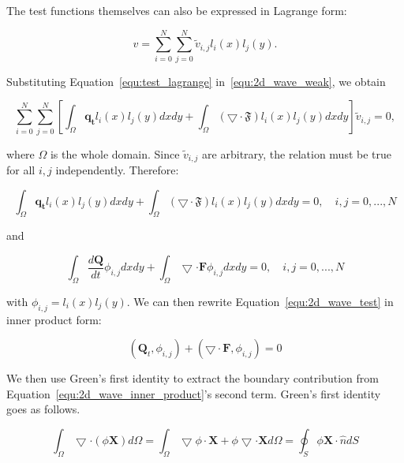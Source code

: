 The test functions themselves can also be expressed in Lagrange form:

\begin{equation} \label{equ:test_lagrange}
	v = \sum^{N}_{i = 0}\sum_{j = 0}^{N}\widetilde{v}_{i, j}l_i(x)l_j(y).
\end{equation}

Substituting Equation~\ref{equ:test_lagrange} in~\ref{equ:2d_wave_weak}, we obtain

\begin{equation}
	\sum_{i = 0}^{N}\sum_{j = 0}^{N} \left[ \int_{\Omega }\mathbf{q_t} l_i(x) l_j(y) dx dy + \int_{\Omega } \left( \bigtriangledown \cdot \mathfrak{F} \right) l_i(x) l_j(y) dx dy \right] \widetilde{v}_{i, j} = 0,
\end{equation}

\noindent
where $\Omega$ is the whole domain. Since $\widetilde{v}_{i, j}$ are arbitrary, the relation must be
true for all $i,j$ independently. Therefore:

\begin{equation}
    \int_{\Omega} \mathbf{q_t} l_i(x) l_j(y) dx dy + \int_{\Omega } \left( \bigtriangledown \cdot \mathfrak{F} \right) l_i(x) l_j(y) dx dy = 0, \quad i,j = 0, ..., N
\end{equation}

\noindent
and

\begin{equation} %
    \int_{\Omega} \frac{d\mathbf{Q}}{dt} \phi_{i, j} dx dy
    + \int _{\Omega} \bigtriangledown \cdot \mathbf{F} \phi_{i, j} dx dy = 0, \quad i,j = 0, ..., N \label{equ:2d_wave_test}
\end{equation}

\noindent
with $\phi_{i, j} = l_i(x)l_j(y)$. We can then rewrite Equation~\ref{equ:2d_wave_test} in inner
product form: 

\begin{equation} \label{equ:2d_wave_inner_product}
	\left( \mathbf{Q}_t, \phi_{i, j} \right) + \left( \bigtriangledown \cdot \mathbf{F}, \phi_{i, j} \right) = 0
\end{equation}

We then use Green's first identity to extract the boundary contribution from
Equation~\ref{equ:2d_wave_inner_product}'s second term. Green's first identity goes as follows.

\begin{equation}
    \int_{\Omega} \bigtriangledown \cdot \left( \phi \mathbf{X} \right) d\Omega  = 
    \int_{\Omega} \bigtriangledown \phi \cdot \mathbf{X} + \phi \bigtriangledown \cdot \mathbf{X} d\Omega = \oint _{S} \phi \mathbf{X} \cdot \widehat{n} dS
\end{equation}

